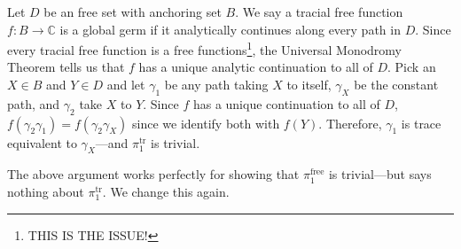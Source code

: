 \documentclass[11pt]{exam}
\newcommand{\CC}{\mathbb{C}}
\begin{document}
Let $D$ be an free set with anchoring set $B$. We say a tracial free function
$f: B \to \CC $ is a global germ if it analytically continues along every path
in $D$. Since every tracial free function is a free functions\footnote{THIS IS
  THE ISSUE!},  the
Universal Monodromy Theorem tells us that $f$ has a unique analytic
continuation to all of $D$. Pick an $X \in B$ and $Y \in D$ and
let $\gamma_1$ be any path taking $X$ to itself, $\gamma_X$ be the constant
path, and $\gamma_2$ take $X$ to  $Y$. Since $f$ has a unique continuation to all of $D$,
$f(\gamma_2\gamma_1) = f(\gamma_2\gamma_X)$ since we identify both with $f(Y)$.
Therefore, $\gamma_1$ is trace equivalent to $\gamma_X$---and
$\pi_1^{\text{tr} }$ is trivial.

The above argument works perfectly for showing that $\pi_1^{\text{free} }$ is
trivial---but says nothing about $\pi_1^{\text{tr} }$. We change this again.
\end{document}
